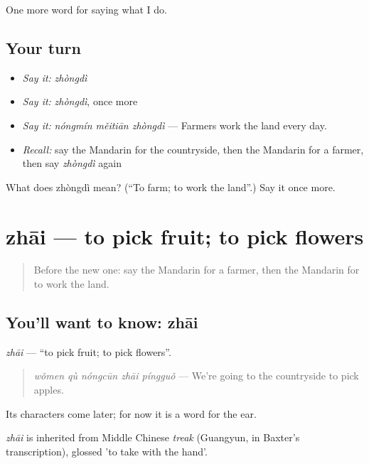 \begin{grammarlens}[title={What you've built}]
One more word for saying what I do.
\end{grammarlens}

\subsection*{Your turn}
\begin{itemize}
\raggedright
  \item \emph{Say it:} \emph{zhòngdì}
  \item \emph{Say it:} \emph{zhòngdì}, once more
  \item \emph{Say it:} \emph{nóngmín měitiān zhòngdì} — Farmers work the land every day.
  \item \emph{Recall:} say the Mandarin for the countryside, then the Mandarin for a farmer, then say \emph{zhòngdì} again
\end{itemize}

\begin{tcolorbox}[breakable,colback=teal!4,colframe=teal!35!black,title={Before you move on}]
What does zhòngdì mean? (\textquotedblleft{}To farm; to work the land\textquotedblright{}.) Say it once more.
\end{tcolorbox}
\section[zhāi]{zhāi — to pick fruit; to pick flowers}

\label{lesson:ZH-C225-zhai}



\begin{quote}
Before the new one: say the Mandarin for a farmer, then the Mandarin for to work the land.
\end{quote}

\subsection*{You'll want to know: zhāi}
\emph{zhāi} — \textquotedblleft{}to pick fruit; to pick flowers\textquotedblright{}.

\begin{quote}
\emph{wǒmen qù nóngcūn zhāi píngguǒ} — We're going to the countryside to pick apples.
\end{quote}

Its characters come later; for now it is a word for the ear.

\begin{cousinweb}
\emph{zhāi} is inherited from Middle Chinese \emph{treak} (Guangyun, in Baxter's transcription), glossed 'to take with the hand'.
\end{cousinweb}

